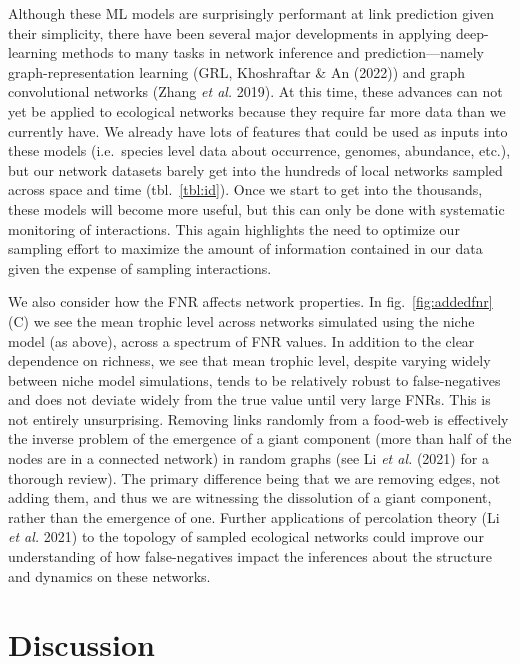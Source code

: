 \documentclass[11pt]{article}
\begin{document}
Although these ML models are surprisingly performant at link prediction
given their simplicity, there have been several major developments in
applying deep-learning methods to many tasks in network inference and
prediction---namely graph-representation learning (GRL, Khoshraftar \&
An (2022)) and graph convolutional networks (Zhang \emph{et al.} 2019).
At this time, these advances can not yet be applied to ecological
networks because they require far more data than we currently have. We
already have lots of features that could be used as inputs into these
models (i.e.~species level data about occurrence, genomes, abundance,
etc.), but our network datasets barely get into the hundreds of local
networks sampled across space and time (tbl.~\ref{tbl:id}). Once we
start to get into the thousands, these models will become more useful,
but this can only be done with systematic monitoring of interactions.
This again highlights the need to optimize our sampling effort to
maximize the amount of information contained in our data given the
expense of sampling interactions.

We also consider how the FNR affects network properties. In
fig.~\ref{fig:addedfnr}(C) we see the mean trophic level across networks
simulated using the niche model (as above), across a spectrum of FNR
values. In addition to the clear dependence on richness, we see that
mean trophic level, despite varying widely between niche model
simulations, tends to be relatively robust to false-negatives and does
not deviate widely from the true value until very large FNRs. This is
not entirely unsurprising. Removing links randomly from a food-web is
effectively the inverse problem of the emergence of a giant component
(more than half of the nodes are in a connected network) in random
graphs (see Li \emph{et al.} (2021) for a thorough review). The primary
difference being that we are removing edges, not adding them, and thus
we are witnessing the dissolution of a giant component, rather than the
emergence of one. Further applications of percolation theory (Li
\emph{et al.} 2021) to the topology of sampled ecological networks could
improve our understanding of how false-negatives impact the inferences
about the structure and dynamics on these networks.

\hypertarget{discussion}{%
\section{Discussion}\label{discussion}}
\end{document}
